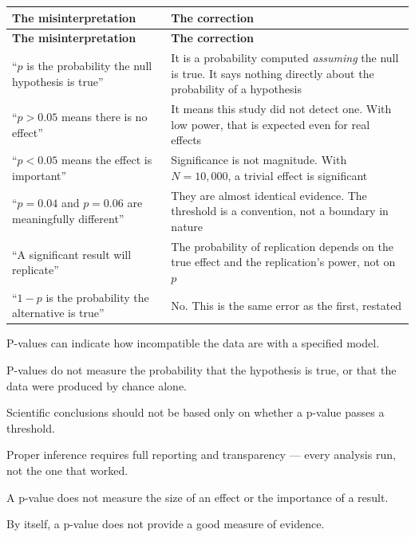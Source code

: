 \begin{center}
\small
\begin{longtable}{@{}L{6.4cm}L{7.9cm}@{}}
\toprule
\textbf{The misinterpretation} & \textbf{The correction} \\
\midrule
\endfirsthead
\toprule
\textbf{The misinterpretation} & \textbf{The correction} \\
\midrule
\endhead
\bottomrule
\endfoot
``$p$ is the probability the null hypothesis is true''
  & It is a probability computed \emph{assuming} the null is true. It says
    nothing directly about the probability of a hypothesis \\
``$p > 0.05$ means there is no effect''
  & It means this study did not detect one. With low power, that is expected
    even for real effects \\
``$p < 0.05$ means the effect is important''
  & Significance is not magnitude. With $N = 10{,}000$, a trivial effect is
    significant \\
``$p = 0.04$ and $p = 0.06$ are meaningfully different''
  & They are almost identical evidence. The threshold is a convention, not a
    boundary in nature \\
``A significant result will replicate''
  & The probability of replication depends on the true effect and the
    replication's power, not on $p$ \\
``$1 - p$ is the probability the alternative is true''
  & No. This is the same error as the first, restated \\
\end{longtable}
\end{center}

\begin{alertbox}
\begin{tightnum}
  \item P-values can indicate how incompatible the data are with a specified
    model.
  \item P-values do not measure the probability that the hypothesis is true, or
    that the data were produced by chance alone.
  \item Scientific conclusions should not be based only on whether a p-value
    passes a threshold.
  \item Proper inference requires full reporting and transparency --- every
    analysis run, not the one that worked.
  \item A p-value does not measure the size of an effect or the importance of a
    result.
  \item By itself, a p-value does not provide a good measure of evidence.
\end{tightnum}
\end{alertbox}

